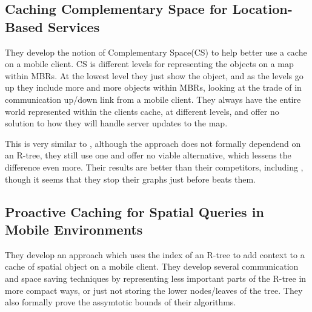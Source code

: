 \subsection{Caching Complementary Space for Location-Based Services}
They develop the notion of Complementary Space(CS) to help better use a cache on a mobile client. CS is different levels for representing the objects on a map within MBRs. At the lowest level they just show the object, and as the levels go up they include more and more objects within MBRs, looking at the trade of in communication up/down link from a mobile client. They always have the entire world represented within the clients cache, at different levels, and offer no solution to how they will handle server updates to the map.

This is very similar to \cite{pcsqm}, although the approach does not formally dependend on an R-tree, they still use one and offer no viable alternative, which lessens the difference even more. Their results are better than their competitors, including \cite{pcsqm}, though it seems that they stop their graphs just before \cite{pcsqm} beats them.



\subsection{Proactive Caching for Spatial Queries in Mobile Environments}

They develop an approach which uses the index of an R-tree to add context to a cache of spatial object on a mobile client. They develop several communication and space saving techniques by representing less important parts of the R-tree in more compact ways, or just not storing the lower nodes/leaves of the tree. They also formally prove the assymtotic bounds of their algorithms.


